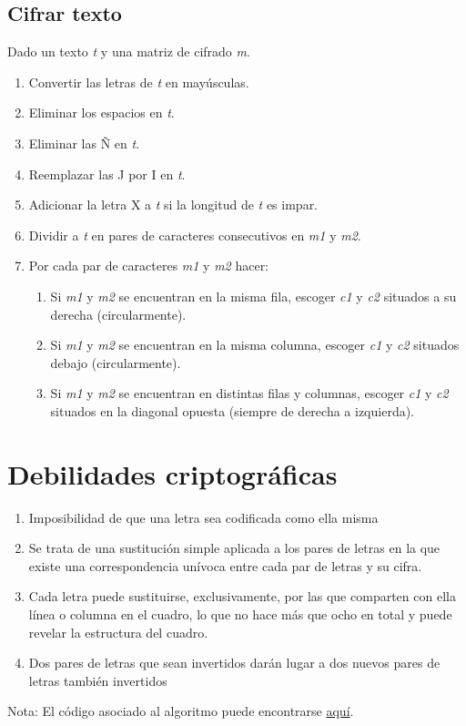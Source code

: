 \documentclass{article}
\begin{document}
    \subsection{Cifrar texto}
    Dado un texto \textit{t} y una matriz de cifrado \textit{m}.
    \begin{enumerate}
        \item Convertir las letras de  \textit{t} en mayúsculas.
        \item Eliminar los espacios en \textit{t}.
        \item Eliminar las Ñ en \textit{t}.
        \item Reemplazar las J por I en \textit{t}.
        \item Adicionar la letra X a \textit{t} si la longitud de \textit{t} es impar.
        \item Dividir a \textit{t} en pares de caracteres consecutivos en \textit{m1} y  \textit{m2}.
        \item Por cada par de caracteres \textit{m1} y \textit{m2} hacer:
            \begin{enumerate}
                \item Si \textit{m1} y \textit{m2} se encuentran en la misma fila, escoger \textit{c1} y \textit{c2} situados a su derecha (circularmente).
                \item Si \textit{m1} y \textit{m2} se encuentran en la misma columna, escoger \textit{c1} y \textit{c2} situados debajo (circularmente).
                \item Si \textit{m1} y \textit{m2} se encuentran en distintas filas y columnas, escoger \textit{c1} y \textit{c2} situados en la diagonal opuesta (siempre de derecha a izquierda).
            \end{enumerate}
    \end{enumerate}
    \section{Debilidades criptográficas}
    \begin{enumerate}
        \item Imposibilidad de que una letra sea codificada como ella misma
        \item Se trata de una sustitución simple aplicada a los pares de letras en la que existe una correspondencia unívoca entre cada par de letras y su cifra.
        \item Cada letra puede sustituirse, exclusivamente, por las que comparten con ella línea o columna en el cuadro, lo que no hace más que ocho en total y puede revelar la estructura del cuadro.
        \item Dos pares de letras que sean invertidos darán lugar a dos nuevos pares de letras también invertidos
    \end{enumerate}


    Nota: El código asociado al algoritmo puede encontrarse \href{https://github.com/Gaspect/playfair}{aquí}. 
\end{document}
